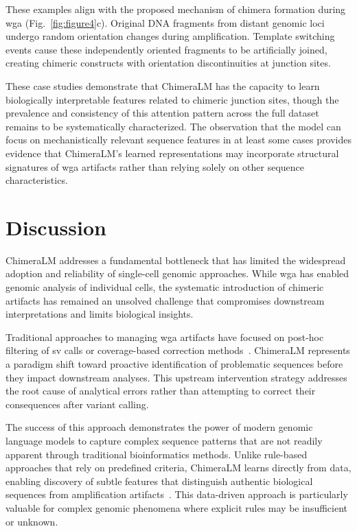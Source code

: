 \documentclass[pdflatex,sn-nature]{sn-jnl}%
\theoremstyle{thmstyleone}%
\theoremstyle{thmstyletwo}%
\theoremstyle{thmstylethree}%
\begin{document}
These examples align with the proposed mechanism of chimera formation during \gls{wga} (Fig.~\ref{fig:figure4}c).
Original DNA fragments from distant genomic loci undergo random orientation changes during amplification.
Template switching events cause these independently oriented fragments to be artificially joined, creating chimeric constructs with orientation discontinuities at junction sites.

These case studies demonstrate that ChimeraLM has the capacity to learn biologically interpretable features related to chimeric junction sites, though the prevalence and consistency of this attention pattern across the full dataset remains to be systematically characterized.
The observation that the model can focus on mechanistically relevant sequence features in at least some cases provides evidence that ChimeraLM's learned representations may incorporate structural signatures of \gls{wga} artifacts rather than relying solely on other sequence characteristics.

\section*{Discussion}
ChimeraLM addresses a fundamental bottleneck that has limited the widespread adoption and reliability of single-cell genomic approaches.
While \gls{wga} has enabled genomic analysis of individual cells, the systematic introduction of chimeric artifacts has remained an unsolved challenge that compromises downstream interpretations and limits biological insights.

Traditional approaches to managing \gls{wga} artifacts have focused on post-hoc filtering of \gls{sv} calls or coverage-based correction methods~\cite{kiguchi2021long, lu2023exploration}.
ChimeraLM represents a paradigm shift toward proactive identification of problematic sequences before they impact downstream analyses.
This upstream intervention strategy addresses the root cause of analytical errors rather than attempting to correct their consequences after variant calling.

The success of this approach demonstrates the power of modern genomic language models to capture complex sequence patterns that are not readily apparent through traditional bioinformatics methods.
Unlike rule-based approaches that rely on predefined criteria, ChimeraLM learns directly from data, enabling discovery of subtle features that distinguish authentic biological sequences from amplification artifacts~\cite{lu2023exploration, agyabeng2025evaluating, nguyen2023hyenadna}.
This data-driven approach is particularly valuable for complex genomic phenomena where explicit rules may be insufficient or unknown.
\end{document}

